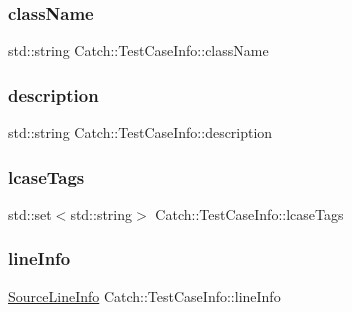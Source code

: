 \subsubsection{\texorpdfstring{class\+Name}{className}}
{\footnotesize\ttfamily std\+::string Catch\+::\+Test\+Case\+Info\+::class\+Name}

\hypertarget{struct_catch_1_1_test_case_info_a37fe2db9425bc45f6a33893eac31198e}{}\label{struct_catch_1_1_test_case_info_a37fe2db9425bc45f6a33893eac31198e} 
\subsubsection{\texorpdfstring{description}{description}}
{\footnotesize\ttfamily std\+::string Catch\+::\+Test\+Case\+Info\+::description}

\hypertarget{struct_catch_1_1_test_case_info_a0ed3864a313e8ddc3ae38431be5be9ae}{}\label{struct_catch_1_1_test_case_info_a0ed3864a313e8ddc3ae38431be5be9ae} 
\subsubsection{\texorpdfstring{lcase\+Tags}{lcaseTags}}
{\footnotesize\ttfamily std\+::set$<$std\+::string$>$ Catch\+::\+Test\+Case\+Info\+::lcase\+Tags}

\hypertarget{struct_catch_1_1_test_case_info_aa9407b7f442655b51a2aad24b3fa2fd3}{}\label{struct_catch_1_1_test_case_info_aa9407b7f442655b51a2aad24b3fa2fd3} 
\subsubsection{\texorpdfstring{line\+Info}{lineInfo}}
{\footnotesize\ttfamily \hyperlink{struct_catch_1_1_source_line_info}{Source\+Line\+Info} Catch\+::\+Test\+Case\+Info\+::line\+Info}

\hypertarget{struct_catch_1_1_test_case_info_a463794e2f5cfead307c93efd134ade36}{}\label{struct_catch_1_1_test_case_info_a463794e2f5cfead307c93efd134ade36} 
